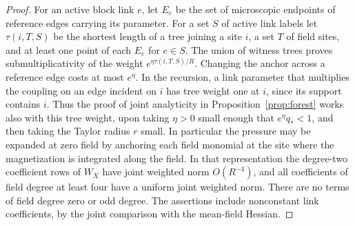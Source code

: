 \documentclass[11pt]{article}
\begin{document}
\begin{proof}
For an active block link \(e\), let \(E_e\) be the set of microscopic
endpoints of reference edges carrying its parameter. For a set
\(S\) of active link labels let \(\tau(i,T,S)\) be the shortest length
of a tree joining a site \(i\), a set \(T\) of field sites, and
at least one point of each \(E_e\) for \(e\in S\). The union of
witness trees proves submultiplicativity of the weight
\(e^{\eta\tau(i,T,S)/R}\). Changing the anchor across a reference edge
costs at most \(e^\eta\). In the recursion, a link parameter that
multiplies the coupling on an edge incident on \(i\) has tree
weight one at \(i\), since its support contains \(i\). Thus the
proof of joint analyticity in Proposition~\ref{prop:forest}
works also with this tree weight, upon taking \(\eta>0\) small enough
that \(e^\eta q_*<1\), and then taking the Taylor radius \(r\) small.
In particular the pressure may be expanded at zero field by
anchoring each field monomial at the site where the magnetization
is integrated along the field. In that representation the degree-two
coefficient rows of \(W_X\) have joint weighted norm \(O(R^{-4})\),
and all coefficients of field degree at least four have a
uniform joint weighted norm. There are no terms of field degree zero
or odd degree. The assertions include nonconstant link coefficients,
by the joint comparison with the mean-field Hessian.


\end{proof}
\end{document}
